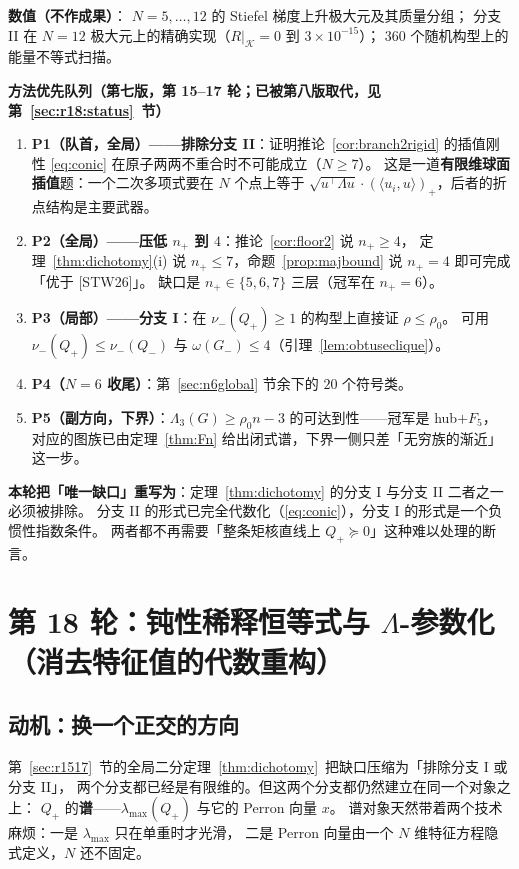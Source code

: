 \documentclass[UTF8,11pt]{ctexart}
\theoremstyle{definition}
\newcommand{\Lam}{\Lambda}
\newcommand{\STW}{\textup{[STW26]}}
\begin{document}
\textbf{数值（不作成果）}：
$N=5,\dots,12$ 的 Stiefel 梯度上升极大元及其质量分组；
分支 II 在 $N=12$ 极大元上的精确实现（$R|_{\mathcal K}=0$ 到 $3\times10^{-15}$）；
$360$ 个随机构型上的能量不等式扫描。

\textbf{方法优先队列（第七版，第 15--17 轮；已被第八版取代，见第~\ref{sec:r18:status}~节）}
\begin{enumerate}\itemsep3pt
\item \textbf{P1（队首，全局）——排除分支 II}：证明推论~\ref{cor:branch2rigid} 的插值刚性
\eqref{eq:conic} 在原子两两不重合时不可能成立（$N\ge7$）。
这是一道\textbf{有限维球面插值}题：一个二次多项式要在 $N$ 个点上等于
$\sqrt{u^\top\Lam u}\cdot(\langle u_i,u\rangle)_+$，后者的折点结构是主要武器。
\item \textbf{P2（全局）——压低 $n_+$ 到 $4$}：推论~\ref{cor:floor2} 说 $n_+\ge4$，
定理~\ref{thm:dichotomy}(i) 说 $n_+\le7$，命题~\ref{prop:majbound} 说 $n_+=4$ 即可完成「优于 \STW」。
缺口是 $n_+\in\{5,6,7\}$ 三层（冠军在 $n_+=6$）。
\item \textbf{P3（局部）——分支 I}：在 $\nu_-(Q_+)\ge1$ 的构型上直接证 $\rho\le\rho_0$。
可用 $\nu_-(Q_+)\le\nu_-(Q_-)$ 与 $\omega(G_-)\le4$（引理~\ref{lem:obtuseclique}）。
\item \textbf{P4（$N=6$ 收尾）}：第~\ref{sec:n6global} 节余下的 $20$ 个符号类。
\item \textbf{P5（副方向，下界）}：$\Lambda_3(G)\ge\rho_0n-3$ 的可达到性——冠军是 hub$+F_5$，
对应的图族已由定理~\ref{thm:Fn} 给出闭式谱，下界一侧只差「无穷族的渐近」这一步。
\end{enumerate}

\textbf{本轮把「唯一缺口」重写为}：定理~\ref{thm:dichotomy} 的分支 I 与分支 II 二者之一必须被排除。
分支 II 的形式已完全代数化（\eqref{eq:conic}），分支 I 的形式是一个负惯性指数条件。
两者都不再需要「整条矩核直线上 $Q_+\succeq0$」这种难以处理的断言。




\section{第 18 轮：钝性稀释恒等式与 $\Lam$-参数化（消去特征值的代数重构）}\label{sec:r18}

\subsection{动机：换一个正交的方向}\label{sec:r18:motiv}

第~\ref{sec:r1517}~节的全局二分定理~\ref{thm:dichotomy}~把缺口压缩为「排除分支 I 或分支 II」，
两个分支都已经是有限维的。但这两个分支都仍然建立在同一个对象之上：
$Q_+$ 的\textbf{谱}——$\lambda_{\max}(Q_+)$ 与它的 Perron 向量 $x$。
谱对象天然带着两个技术麻烦：一是 $\lambda_{\max}$ 只在单重时才光滑，
二是 Perron 向量由一个 $N$ 维特征方程隐式定义，$N$ 还不固定。
\end{document}
